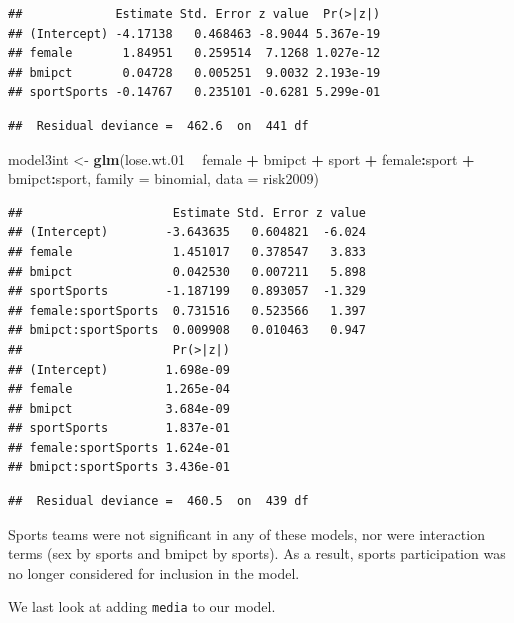 \documentclass[
]{krantz}
\newenvironment{Shaded}{\begin{snugshade}}{\end{snugshade}}
\newcommand{\DataTypeTok}[1]{\textcolor[rgb]{0.27,0.27,0.27}{#1}}
\newcommand{\FloatTok}[1]{\textcolor[rgb]{0.06,0.06,0.06}{#1}}
\newcommand{\KeywordTok}[1]{\textcolor[rgb]{0.27,0.27,0.27}{\textbf{#1}}}
\newcommand{\NormalTok}[1]{#1}
\newcommand{\OperatorTok}[1]{\textcolor[rgb]{0.43,0.43,0.43}{\textbf{#1}}}
\newcommand{\StringTok}[1]{\textcolor[rgb]{0.5,0.5,0.5}{#1}}
\begin{document}
\begin{verbatim}
##             Estimate Std. Error z value  Pr(>|z|)
## (Intercept) -4.17138   0.468463 -8.9044 5.367e-19
## female       1.84951   0.259514  7.1268 1.027e-12
## bmipct       0.04728   0.005251  9.0032 2.193e-19
## sportSports -0.14767   0.235101 -0.6281 5.299e-01
\end{verbatim}

\begin{verbatim}
##  Residual deviance =  462.6  on  441 df
\end{verbatim}

\begin{Shaded}
\begin{Highlighting}[]
\NormalTok{model3int <-}\StringTok{ }\KeywordTok{glm}\NormalTok{(lose.wt}\FloatTok{.01} \OperatorTok{~}\StringTok{ }\NormalTok{female }\OperatorTok{+}\StringTok{ }\NormalTok{bmipct }\OperatorTok{+}\StringTok{ }\NormalTok{sport }\OperatorTok{+}
\StringTok{              }\NormalTok{female}\OperatorTok{:}\NormalTok{sport }\OperatorTok{+}\StringTok{ }\NormalTok{bmipct}\OperatorTok{:}\NormalTok{sport, }
              \DataTypeTok{family =}\NormalTok{ binomial, }\DataTypeTok{data =}\NormalTok{ risk2009)}
\end{Highlighting}
\end{Shaded}

\begin{verbatim}
##                     Estimate Std. Error z value
## (Intercept)        -3.643635   0.604821  -6.024
## female              1.451017   0.378547   3.833
## bmipct              0.042530   0.007211   5.898
## sportSports        -1.187199   0.893057  -1.329
## female:sportSports  0.731516   0.523566   1.397
## bmipct:sportSports  0.009908   0.010463   0.947
##                     Pr(>|z|)
## (Intercept)        1.698e-09
## female             1.265e-04
## bmipct             3.684e-09
## sportSports        1.837e-01
## female:sportSports 1.624e-01
## bmipct:sportSports 3.436e-01
\end{verbatim}

\begin{verbatim}
##  Residual deviance =  460.5  on  439 df
\end{verbatim}

Sports teams were not significant in any of these models, nor were interaction terms (sex by sports and bmipct by sports). As a result, sports participation was no longer considered for inclusion in the model.

We last look at adding \texttt{media} to our model.
\end{document}
